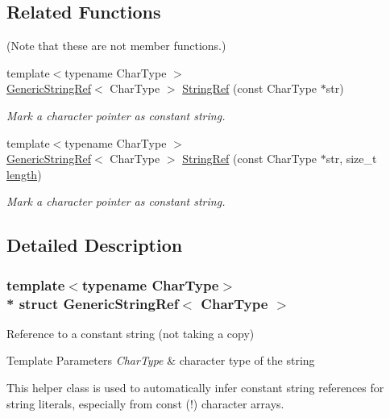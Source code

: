 \subsection*{Related Functions}
(Note that these are not member functions.) \begin{DoxyCompactItemize}
\item 
{\footnotesize template$<$typename Char\+Type $>$ }\\\hyperlink{structGenericStringRef}{Generic\+String\+Ref}$<$ Char\+Type $>$ \hyperlink{structGenericStringRef_aa6b9fd9f6aa49405a574c362ba9af6b5}{String\+Ref} (const Char\+Type $\ast$str)
\begin{DoxyCompactList}\small\item\em Mark a character pointer as constant string. \end{DoxyCompactList}\item 
{\footnotesize template$<$typename Char\+Type $>$ }\\\hyperlink{structGenericStringRef}{Generic\+String\+Ref}$<$ Char\+Type $>$ \hyperlink{structGenericStringRef_a578c51ab574a50a9c760b9da7c7562f2}{String\+Ref} (const Char\+Type $\ast$str, size\+\_\+t \hyperlink{structGenericStringRef_a4a96d618744ad73f766a1551b1d517fe}{length})
\begin{DoxyCompactList}\small\item\em Mark a character pointer as constant string. \end{DoxyCompactList}\end{DoxyCompactItemize}


\subsection{Detailed Description}
\subsubsection*{template$<$typename Char\+Type$>$\\*
struct Generic\+String\+Ref$<$ Char\+Type $>$}

Reference to a constant string (not taking a copy) 


\begin{DoxyTemplParams}{Template Parameters}
{\em Char\+Type} & character type of the string\\
\hline
\end{DoxyTemplParams}
This helper class is used to automatically infer constant string references for string literals, especially from {\ttfamily const} {\bfseries }(!) character arrays.

